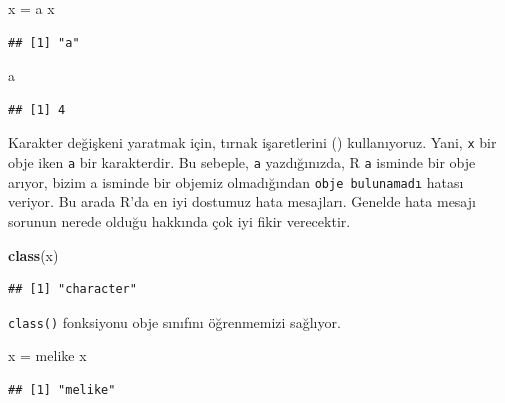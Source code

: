 \documentclass[
]{book}
\newenvironment{Shaded}{\begin{snugshade}}{\end{snugshade}}
\newcommand{\KeywordTok}[1]{\textcolor[rgb]{0.13,0.29,0.53}{\textbf{#1}}}
\newcommand{\NormalTok}[1]{#1}
\newcommand{\StringTok}[1]{\textcolor[rgb]{0.31,0.60,0.02}{#1}}
\begin{document}
\begin{Shaded}
\begin{Highlighting}[]
\NormalTok{x =}\StringTok{ \textquotesingle{}a\textquotesingle{}}
\NormalTok{x}
\end{Highlighting}
\end{Shaded}

\begin{verbatim}
## [1] "a"
\end{verbatim}

\begin{Shaded}
\begin{Highlighting}[]
\NormalTok{a}
\end{Highlighting}
\end{Shaded}

\begin{verbatim}
## [1] 4
\end{verbatim}

Karakter değişkeni yaratmak için, tırnak işaretlerini (\texttt{\textquotesingle{}\textquotesingle{}}) kullanıyoruz. Yani, \texttt{x} bir obje iken \texttt{\textquotesingle{}a\textquotesingle{}} bir karakterdir. Bu sebeple, \texttt{a} yazdığınızda, R \texttt{a} isminde bir obje arıyor, bizim a isminde bir objemiz olmadığından \texttt{obje\ bulunamadı} hatası veriyor. Bu arada R'da en iyi dostumuz hata mesajları. Genelde hata mesajı sorunun nerede olduğu hakkında çok iyi fikir verecektir.

\begin{Shaded}
\begin{Highlighting}[]
\KeywordTok{class}\NormalTok{(x)}
\end{Highlighting}
\end{Shaded}

\begin{verbatim}
## [1] "character"
\end{verbatim}

\texttt{class()} fonksiyonu obje sınıfını öğrenmemizi sağlıyor.

\begin{Shaded}
\begin{Highlighting}[]
\NormalTok{x =}\StringTok{ \textquotesingle{}melike\textquotesingle{}}
\NormalTok{x}
\end{Highlighting}
\end{Shaded}

\begin{verbatim}
## [1] "melike"
\end{verbatim}
\end{document}
